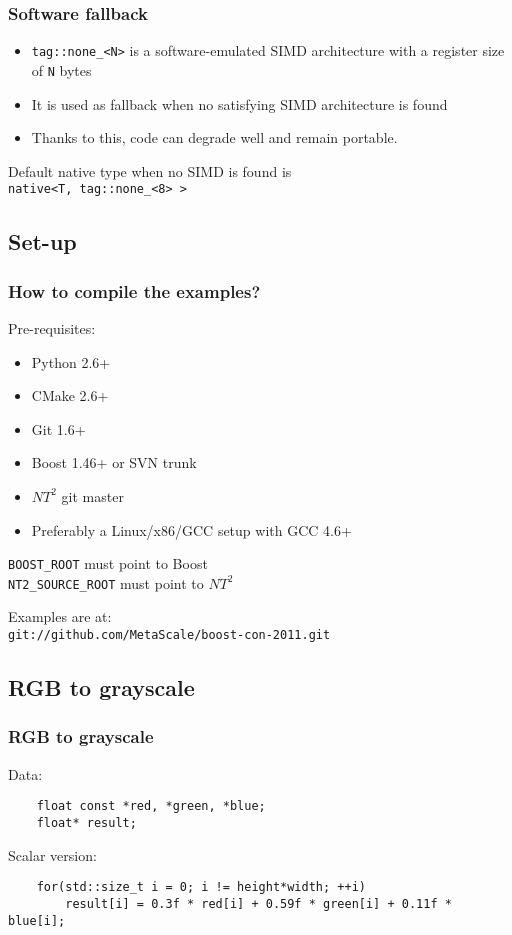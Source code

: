 \documentclass{beamer}
\begin{document}
\begin{frame}
	\frametitle{Software fallback}
	
	\begin{itemize}
		\item \lstinline{tag::none_<N>} is a software-emulated SIMD architecture with a register size of \lstinline{N} bytes
		\item It is used as fallback when no satisfying SIMD architecture is found
		\item Thanks to this, code can degrade well and remain portable.
	\end{itemize}
	\bigskip	
	
	Default native type when no SIMD is found is\\
	\hspace{10px}\lstinline{native<T, tag::none_<8> >}
	
\end{frame}

\subsection{Set-up}
\begin{frame}
	\frametitle{How to compile the examples?}	
	
	Pre-requisites:
	\begin{itemize}
		\item Python 2.6+
		\item CMake 2.6+
		\item Git 1.6+
		\item Boost 1.46+ or SVN trunk
		\item $NT^2$ git master
		\item Preferably a Linux/x86/GCC setup with GCC 4.6+
	\end{itemize}
	\bigskip
	
	\texttt{BOOST\_ROOT} must point to Boost\\
	\texttt{NT2\_SOURCE\_ROOT} must point to $NT^2$
	\bigskip
	
	Examples are at:\\
	\texttt{git://github.com/MetaScale/boost-con-2011.git}
	
\end{frame}

\subsection{RGB to grayscale}
\begin{frame}[fragile]
	\frametitle{RGB to grayscale}
	
	Data:
	\begin{lstlisting}
	float const *red, *green, *blue;
	float* result;
	\end{lstlisting}
	
	Scalar version:
	\begin{lstlisting}
	for(std::size_t i = 0; i != height*width; ++i)
	    result[i] = 0.3f * red[i] + 0.59f * green[i] + 0.11f * blue[i]; 
	\end{lstlisting}
	
\end{frame}
\end{document}
